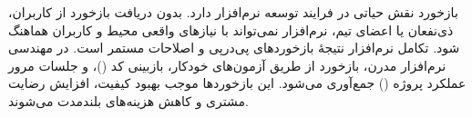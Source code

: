 بازخورد نقش حیاتی در فرایند توسعه نرم‌افزار دارد. بدون دریافت بازخورد از کاربران، ذی‌نفعان یا اعضای تیم، نرم‌افزار نمی‌تواند با نیازهای واقعی محیط و کاربران هماهنگ شود. تکامل نرم‌افزار نتیجهٔ بازخوردهای پی‌درپی و اصلاحات مستمر است. در مهندسی نرم‌افزار مدرن، بازخورد از طریق آزمون‌های خودکار، بازبینی کد ()، و جلسات مرور عملکرد پروژه () جمع‌آوری می‌شود. این بازخوردها موجب بهبود کیفیت، افزایش رضایت مشتری و کاهش هزینه‌های بلندمدت می‌شوند.

